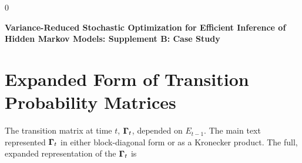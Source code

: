 \documentclass[12pt]{article}
\newcommand{\blind}{0}
\begin{document}
\blind
{
  \bigskip
  \bigskip
  \bigskip
  \begin{center}
    {\LARGE\bf Variance-Reduced Stochastic Optimization for Efficient Inference of Hidden Markov Models: Supplement B: Case Study}
  \end{center}
  \medskip
} \fi

\newpage
{} %

\section{Expanded Form of Transition Probability Matrices}

The transition matrix at time $t$, $\boldsymbol{\Gamma}_t$, depended on $E_{t-1}$. The main text represented $\boldsymbol{\Gamma}_t$ in either block-diagonal form or as a Kronecker product. The full, expanded representation of the $\boldsymbol{\Gamma}_t$ is
%
\end{document}
